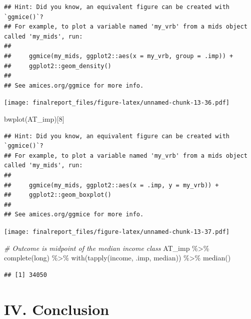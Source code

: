 \documentclass[
]{article}
\newenvironment{Shaded}{\begin{snugshade}}{\end{snugshade}}
\newcommand{\CommentTok}[1]{\textcolor[rgb]{0.56,0.35,0.01}{\textit{#1}}}
\newcommand{\DecValTok}[1]{\textcolor[rgb]{0.00,0.00,0.81}{#1}}
\newcommand{\FunctionTok}[1]{\textcolor[rgb]{0.00,0.00,0.00}{#1}}
\newcommand{\NormalTok}[1]{#1}
\newcommand{\SpecialCharTok}[1]{\textcolor[rgb]{0.00,0.00,0.00}{#1}}
\newcommand{\StringTok}[1]{\textcolor[rgb]{0.31,0.60,0.02}{#1}}
\begin{document}
\begin{verbatim}
## Hint: Did you know, an equivalent figure can be created with `ggmice()`?
## For example, to plot a variable named 'my_vrb' from a mids object called 'my_mids', run: 
## 
##     ggmice(my_mids, ggplot2::aes(x = my_vrb, group = .imp)) +
##     ggplot2::geom_density() 
## 
## See amices.org/ggmice for more info.
\end{verbatim}

\texttt{[image: finalreport\_files/figure-latex/unnamed-chunk-13-36.pdf]}

\begin{Shaded}
\begin{Highlighting}[]
\FunctionTok{bwplot}\NormalTok{(AT\_imp)[}\DecValTok{8}\NormalTok{]}
\end{Highlighting}
\end{Shaded}

\begin{verbatim}
## Hint: Did you know, an equivalent figure can be created with `ggmice()`?
## For example, to plot a variable named 'my_vrb' from a mids object called 'my_mids', run: 
## 
##     ggmice(my_mids, ggplot2::aes(x = .imp, y = my_vrb)) +
##     ggplot2::geom_boxplot() 
## 
## See amices.org/ggmice for more info.
\end{verbatim}

\texttt{[image: finalreport\_files/figure-latex/unnamed-chunk-13-37.pdf]}

\begin{Shaded}
\begin{Highlighting}[]
\CommentTok{\# Outcome is midpoint of the median income class}
\NormalTok{AT\_imp }\SpecialCharTok{\%\textgreater{}\%} 
  \FunctionTok{complete}\NormalTok{(}\StringTok{\textquotesingle{}long\textquotesingle{}}\NormalTok{) }\SpecialCharTok{\%\textgreater{}\%} 
  \FunctionTok{with}\NormalTok{(}\FunctionTok{tapply}\NormalTok{(income, .imp, median)) }\SpecialCharTok{\%\textgreater{}\%} 
  \FunctionTok{median}\NormalTok{()}
\end{Highlighting}
\end{Shaded}

\begin{verbatim}
## [1] 34050
\end{verbatim}

\hypertarget{iv.-conclusion}{%
\section{IV. Conclusion}\label{iv.-conclusion}}
\end{document}
